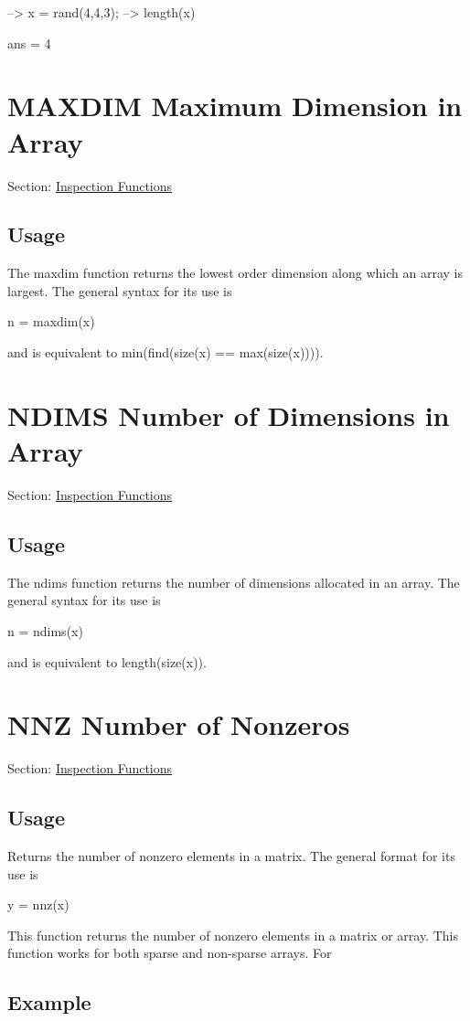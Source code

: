 \begin{DoxyVerbInclude}
--> x = rand(4,4,3);
--> length(x)

ans = 
 4 
\end{DoxyVerbInclude}
 \hypertarget{inspection_maxdim}{}\section{M\-A\-X\-D\-I\-M Maximum Dimension in Array}\label{inspection_maxdim}
Section\-: \hyperlink{sec_inspection}{Inspection Functions} \hypertarget{vtkwidgets_vtkxyplotwidget_Usage}{}\subsection{Usage}\label{vtkwidgets_vtkxyplotwidget_Usage}
The {\ttfamily maxdim} function returns the lowest order dimension along which an array is largest. The general syntax for its use is \begin{DoxyVerb}  n = maxdim(x)
\end{DoxyVerb}
 and is equivalent to min(find(size(x) == max(size(x)))). \hypertarget{inspection_ndims}{}\section{N\-D\-I\-M\-S Number of Dimensions in Array}\label{inspection_ndims}
Section\-: \hyperlink{sec_inspection}{Inspection Functions} \hypertarget{vtkwidgets_vtkxyplotwidget_Usage}{}\subsection{Usage}\label{vtkwidgets_vtkxyplotwidget_Usage}
The {\ttfamily ndims} function returns the number of dimensions allocated in an array. The general syntax for its use is \begin{DoxyVerb}  n = ndims(x)
\end{DoxyVerb}
 and is equivalent to {\ttfamily length(size(x))}. \hypertarget{inspection_nnz}{}\section{N\-N\-Z Number of Nonzeros}\label{inspection_nnz}
Section\-: \hyperlink{sec_inspection}{Inspection Functions} \hypertarget{vtkwidgets_vtkxyplotwidget_Usage}{}\subsection{Usage}\label{vtkwidgets_vtkxyplotwidget_Usage}
Returns the number of nonzero elements in a matrix. The general format for its use is \begin{DoxyVerb}   y = nnz(x)
\end{DoxyVerb}
 This function returns the number of nonzero elements in a matrix or array. This function works for both sparse and non-\/sparse arrays. For \hypertarget{variables_struct_Example}{}\subsection{Example}\label{variables_struct_Example}

